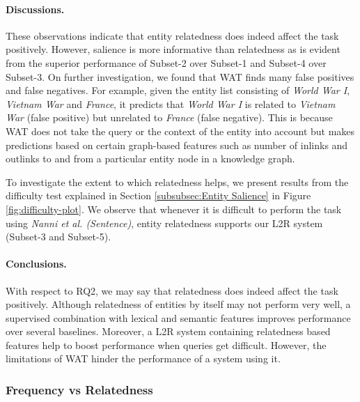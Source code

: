 \paragraph{\textbf{Discussions.}}
These observations indicate that entity relatedness does indeed affect the task positively. However, salience is more informative than relatedness as is evident from the superior performance of Subset-2 over Subset-1 and Subset-4 over Subset-3. On further investigation, we found that WAT finds many false positives and false negatives. For example, given the entity list consisting of  \textit{World War I}, \textit{Vietnam War} and \textit{France}, it predicts that \textit{World War I} is related to \textit{Vietnam War} (false positive) but  unrelated to \textit{France} (false negative). This is because WAT does not take
the query or the context of the entity into account but makes predictions based on certain graph-based features such as number of inlinks and outlinks to and
from a particular entity node in a knowledge graph. 

To investigate the extent to which relatedness helps, we present results from the difficulty test explained in Section \ref{subsubsec:Entity Salience} in Figure \ref{fig:difficulty-plot}. We observe that whenever it is difficult to perform the task using \textit{Nanni et al. (Sentence)}, entity relatedness supports our L2R system (Subset-3 and Subset-5).


\paragraph{\textbf{Conclusions.}}
With respect to RQ2, we may say that relatedness does indeed affect the task positively. Although relatedness of entities by itself may not perform very well, a supervised combination with lexical and semantic features improves performance over several baselines. Moreover, a L2R system containing relatedness based features help to boost performance when queries get difficult. However, the limitations of WAT hinder the performance of a system using it.


\subsubsection{Frequency vs Relatedness}
\label{Frequency vs Relatedness}

